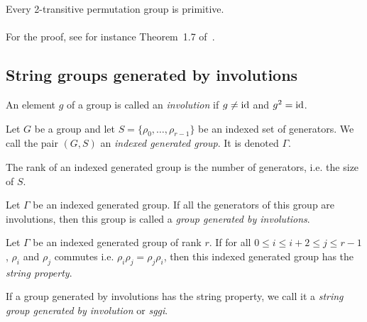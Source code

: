 \begin{property}
  \label{2-transitive-primitive}
  Every 2-transitive permutation group is primitive.
\end{property}

\paragraph{}
For the proof, see for instance Theorem~1.7 of~\cite{cameronPermutationGroups}.

\subsection{String groups generated by involutions}

\begin{definition}[Involution]
  An element $g$ of a group is called an \textit{involution} if $g \neq \operatorname{id}$ and $g^2 = \operatorname{id}$.
\end{definition}

\begin{definition}
  Let $G$ be a group and let $S = \{\rho_0, \dots, \rho_{r-1}\}$ be an indexed set of generators.
  We call the pair $(G,S)$ an \textit{indexed generated group}. It is denoted $\Gamma$.
\end{definition}

\begin{definition}
  The rank of an indexed generated group is the number of generators, i.e. the size of $S$.
\end{definition}

\begin{definition}
  Let $\Gamma$ be an indexed generated group. If all the generators of this group are involutions, then this group is called a \textit{group generated by involutions}.
\end{definition}

\begin{definition}
  Let $\Gamma$ be an indexed generated group of rank $r$. If for all $0 \le i \le i + 2 \le j \le r-1$, $\rho_i$ and $\rho_j$ commutes i.e. $\rho_i \rho_j = \rho_j\rho_i$, then this indexed generated group has the \textit{string property}.
\end{definition}

\begin{definition}
  If a group generated by involutions has the string property, we call it a \textit{string group generated by involution} or \textit{sggi}.
\end{definition}

